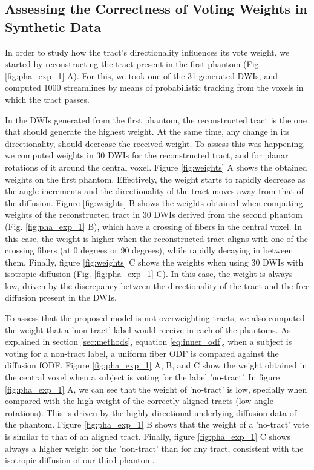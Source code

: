 \subsection{Assessing the Correctness of Voting Weights in Synthetic Data}
In order to study how the tract's directionality influences its vote weight,
we started by reconstructing the tract present in the first phantom (Fig. \ref{fig:pha_exp_1} A).
For this, we took one of the 31 generated DWIs, and computed 1000 streamlines by
means of probabilistic tracking from the voxels in which the tract passes.

In the DWIs generated from the first phantom, the reconstructed tract is the one
that should generate the highest weight. At the same time, any change in its
directionality, should decrease the received weight. To assess this was happening,
we computed weights in 30 DWIs for the reconstructed tract, and for planar
rotations of it around the central voxel. Figure \ref{fig:weights} A shows the
obtained weights on the first phantom. Effectively, the weight starts to rapidly
decrease as the angle increments and the directionality of the tract moves away
from that of the diffusion. Figure \ref{fig:weights} B shows the weights obtained
when computing weights of the reconstructed tract in 30 DWIs derived from the
second phantom (Fig. \ref{fig:pha_exp_1} B), which have a crossing of fibers in
the central voxel. In this case, the weight is higher when the reconstructed tract
aligns with one of the crossing fibers (at 0 degrees or 90 degrees), while rapidly
decaying in between them. Finally, figure \ref{fig:weights} C shows the weights
when using 30 DWIs with isotropic diffusion (Fig. \ref{fig:pha_exp_1} C). In this
case, the weight is always low, driven by the discrepancy between the
directionality of the tract and the free diffusion present in the DWIs.

To assess that the proposed model is not overweighting tracts, we also computed
the weight that a 'non-tract' label would receive in each of the phantoms. As
explained in section \ref{sec:methods}, equation \ref{eq:inner_odf}, when a
subject is voting for a non-tract label, a uniform fiber ODF is compared against
the diffusion fODF. Figure \ref{fig:pha_exp_1} A, B, and C show the weight
obtained in the central voxel when a subject is voting for the label 'no-tract'.
In figure \ref{fig:pha_exp_1} A, we can see that the
weight of 'no-tract' is low, specially when compared with the high weight
of the correctly aligned tracts (low angle rotations). This is driven by the
highly directional underlying diffusion data of the phantom. 
Figure \ref{fig:pha_exp_1} B shows that the weight of a 'no-tract' vote is
similar to that of an aligned tract. Finally, figure \ref{fig:pha_exp_1} C
shows always a higher weight for the 'non-tract' than for any tract, consistent
with the isotropic diffusion of our third phantom.

